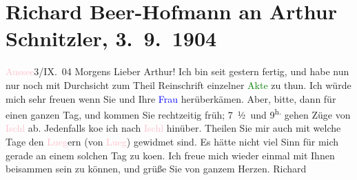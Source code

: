 

               \section[Richard Beer-Hofmann an Arthur Schnitzler, 3. 9. 1904]{ Richard Beer-Hofmann an Arthur Schnitzler, 3. 9. 1904}\nopagebreak{}\rehead{ }\normalsize\beginnumbering{} \toendnotes[C]{\smallbreak\pagebreak[2]} 
\toendnotes[C]{\smallbreak}\pstart
           \centering{}{\pb}\textcolor{pink}{Aussee}{}\ledrightnote{\textcolor{pink}{Bad Aussee}}{ }3/IX. 04{ }Morgens\pend
           \pstart
           Lieber Arthur! Ich bin seit gestern fertig, und habe nun nur noch
               mit Durchsicht zum Theil Reinschrift einzelner \textcolor{green}{Akte}{} zu thun. Ich würde mich sehr freuen wenn Sie und Ihre
                  \textcolor{blue}{Frau}{}\ledrightnote{\textcolor{blue}{Olga Schnitzler}} herüberkämen. Aber, bitte, dann für einen
               ganzen Tag, und kommen Sie rechtzeitig früh; 7 ½ und 9\textsuperscript{h.} gehen Züge von \textcolor{pink}{Ischl}{}\ledrightnote{\textcolor{pink}{Bad Ischl}} ab. Jedenfalls ko{\geminationm}e ich nach \textcolor{pink}{Ischl}{}\ledrightnote{\textcolor{pink}{Bad Ischl}}
               hinüber. Theilen Sie mir auch mit welche Tage den \textcolor{pink}{Lueg}{}\ledrightnote{\textcolor{pink}{Lueg am Wolfgangsee}}ern (von \textcolor{pink}{Lueg}{}\ledrightnote{\textcolor{pink}{Lueg am Wolfgangsee}}) gewidmet sind. Es hätte
               nicht viel Sinn für mich gerade an einem solchen Tag zu ko{\geminationm}en.\pend
           \pstart
           Ich freue mich wieder einmal mit Ihnen beisammen sein zu können, und grüße Sie von
               ganzem Herzen.\pend
           \pstart \spacefill\mbox{Richard}\pend{}\endnumbering{}  
      